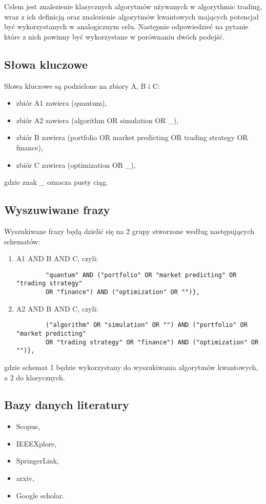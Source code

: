 \documentclass[polish,envcountsect,10pt]{article}
\begin{document}
Celem jest znalezienie klasycznych algorytmów używanych w algorythmic trading, wraz z ich definicją oraz znalezienie algorytmów kwantowych mających potencjał być wykorzystanych w analogicznym celu. 
Następnie odpowiedzieć na pytanie które z nich powinny być wykorzystane w porównaniu dwóch podejść. 

\subsection{Słowa kluczowe}
Słowa kluczowe są podzielone na zbiory A, B i C:
\begin{itemize}
	\item zbiór A1 zawiera (quantum),
	\item zbiór A2 zawiera (algorithm OR simulation OR \_),
	\item zbiór B zawiera (portfolio OR market predicting OR trading strategy OR finance),
	\item zbiór C zawiera (optimization OR \_),
\end{itemize}
gdzie znak \emph{\_} oznacza pusty ciąg.

\subsection{Wyszuwiwane frazy}
Wyszukiwane frazy będą dzielić się na 2 grupy stworzone według następujących schematów:
\begin{enumerate}
	\item A1 AND B AND C, czyli: 
	\begin{verbatim} 
		"quantum" AND ("portfolio" OR "market predicting" OR "trading strategy"
		OR "finance") AND ("optimization" OR "")},
	\end{verbatim}
	\item A2 AND B AND C, czyli:
	\begin{verbatim}
		("algorithm" OR "simulation" OR "") AND ("portfolio" OR "market predicting"
		OR "trading strategy" OR "finance") AND ("optimization" OR "")},
	\end{verbatim}
\end{enumerate} 
gdzie schemat 1 będzie wykorzystany do wyszukiwania algorytmów kwantowych, a 2 do klasycznych. 

\subsection{Bazy danych literatury}

\begin{itemize}
	\item Scopus,
	\item IEEEXplore,
	\item SpringerLink,
	\item arxiv,
	\item Google scholar.
\end{itemize}
\end{document}
